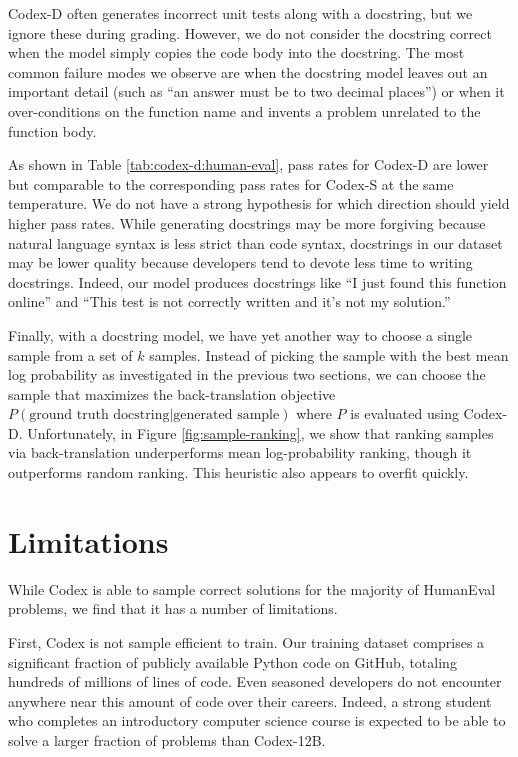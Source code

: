 Codex-D often generates incorrect unit tests along with a docstring, but we ignore these during grading. However, we do not consider the docstring correct when the model simply copies the code body into the docstring. The most common failure modes we observe are when the docstring model leaves out an important detail (such as ``an answer must be to two decimal places'') or when it over-conditions on the function name and invents a problem unrelated to the function body.

As shown in Table \ref{tab:codex-d:human-eval}, pass rates for Codex-D are lower but comparable to the corresponding pass rates for Codex-S at the same temperature. We do not have a strong hypothesis for which direction should yield higher pass rates. While generating docstrings may be more forgiving because natural language syntax is less strict than code syntax, docstrings in our dataset may be lower quality because developers tend to devote less time to writing docstrings. Indeed, our model produces docstrings like ``I just found this function online'' and ``This test is not correctly written and it's not my solution.''

Finally, with a docstring model, we have yet another way to choose a single sample from a set of $k$ samples. Instead of picking the sample with the best mean log probability as investigated in the previous two sections, we can choose the sample that maximizes the back-translation objective $P(\text{ground truth docstring} | \text{generated sample})$ where $P$ is evaluated using Codex-D. Unfortunately, in Figure \ref{fig:sample-ranking}, we show that ranking samples via back-translation underperforms mean log-probability ranking, though it outperforms random ranking. This heuristic also appears to overfit quickly.

\section{Limitations}
\label{sec:limitations}

While Codex is able to sample correct solutions for the majority of HumanEval problems, we find that it has a number of  limitations.

First, Codex is not sample efficient to train. Our training dataset comprises a significant fraction of publicly available Python code on GitHub, totaling hundreds of millions of lines of code. Even seasoned developers do not encounter anywhere near this amount of code over their careers. Indeed, a strong student who completes an introductory computer science course is expected to be able to solve a larger fraction of problems than Codex-12B.


